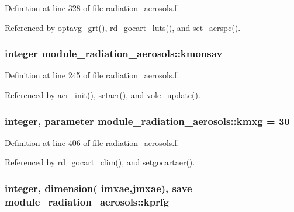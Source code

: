 Definition at line 328 of file radiation\+\_\+aerosols.\+f.



Referenced by optavg\+\_\+grt(), rd\+\_\+gocart\+\_\+luts(), and set\+\_\+aerspc().

\subsubsection[{\texorpdfstring{kmonsav}{kmonsav}}]{\setlength{\rightskip}{0pt plus 5cm}integer module\+\_\+radiation\+\_\+aerosols\+::kmonsav\hspace{0.3cm}{\ttfamily [private]}}\hypertarget{namespacemodule__radiation__aerosols_a302ae8a5aa2b8fb08ad366ef124cee45}{}\label{namespacemodule__radiation__aerosols_a302ae8a5aa2b8fb08ad366ef124cee45}


Definition at line 245 of file radiation\+\_\+aerosols.\+f.



Referenced by aer\+\_\+init(), setaer(), and volc\+\_\+update().

\subsubsection[{\texorpdfstring{kmxg}{kmxg}}]{\setlength{\rightskip}{0pt plus 5cm}integer, parameter module\+\_\+radiation\+\_\+aerosols\+::kmxg = 30\hspace{0.3cm}{\ttfamily [private]}}\hypertarget{namespacemodule__radiation__aerosols_a5339e589d92fab8cbb310b84b6ca3d9e}{}\label{namespacemodule__radiation__aerosols_a5339e589d92fab8cbb310b84b6ca3d9e}


Definition at line 406 of file radiation\+\_\+aerosols.\+f.



Referenced by rd\+\_\+gocart\+\_\+clim(), and setgocartaer().

\subsubsection[{\texorpdfstring{kprfg}{kprfg}}]{\setlength{\rightskip}{0pt plus 5cm}integer, dimension(    {\bf imxae},{\bf jmxae}), save module\+\_\+radiation\+\_\+aerosols\+::kprfg\hspace{0.3cm}{\ttfamily [private]}}\hypertarget{namespacemodule__radiation__aerosols_a28df10ba381278cc7474bea0bfdaa870}{}\label{namespacemodule__radiation__aerosols_a28df10ba381278cc7474bea0bfdaa870}


